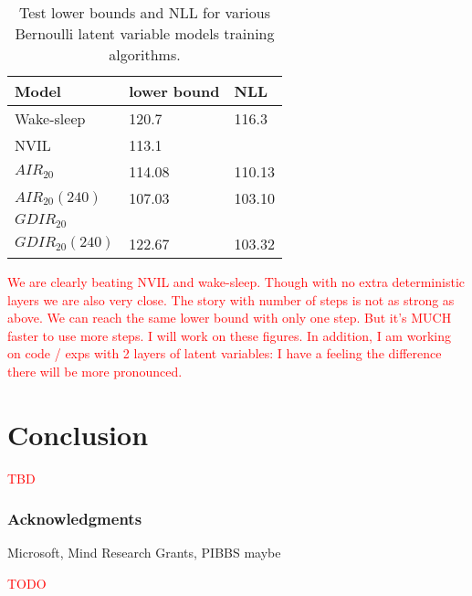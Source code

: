 \documentclass{article} %
\newcommand{\alert}[1]{\textcolor{red}{#1}}
\begin{document}
\begin{table}
\label{table:binary}
\begin{tabular}{ | m{6em} | m{1cm}| m{1cm} | } 
\hline
Model & lower bound & NLL \\ 
\hline
\hline
Wake-sleep & 120.7 & 116.3 \\ 
\hline
NVIL & 113.1 &  \\ 
\hline
$AIR_{20}$ & 114.08 & 110.13 \\
$AIR_{20}(240)$ & 107.03 & 103.10 \\
\hline
$GDIR_{20}$ &  &  \\
$GDIR_{20}(240)$ & 122.67  & 103.32 \\
\hline
\end{tabular}
\caption{Test lower bounds and NLL for various Bernoulli latent variable models training algorithms.}
\end{table}

\alert{We are clearly beating NVIL and wake-sleep. Though with no extra deterministic layers we are also very close. The story with number of steps is not as strong as above. We can reach the same lower bound with only one step. But it's MUCH faster to use more steps. I will work on these figures. In addition, I am working on code / exps with 2 layers of latent variables: I have a feeling the difference there will be more pronounced.}

\section{Conclusion}

\alert{TBD}


\subsubsection*{Acknowledgments}
Microsoft, Mind Research Grants, PIBBS maybe

\alert{TODO}




\end{document}
